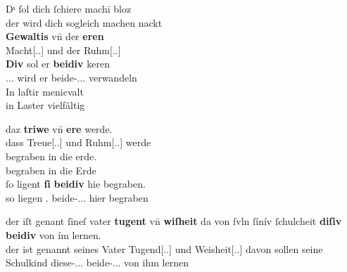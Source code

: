 \begin{exe}
\ex \label{ex:beid2p2combrem}
	\begin{xlist}
	\ex \label{ex:beid2p2combrem_1}
		\gll Dˢ ſol dich ſchiere machī bloz \\
			der wird dich sogleich machen nackt \\
	\sn \gll \textbf{Gewaltis} vn̄ der \textbf{eren} \\
			Macht[\Gen.\Sg.\FemI] und der Ruhm[\Gen.\Pl.\FemI] \\
	\sn \gll \textbf{Div} sol er \textbf{beidiv} keren \\
			\Dem.\Acc.\Pl.\NeutI{} wird er beide-\Acc.\Pl.\NeutI.\St{}
			verwandeln \\
	\sn \gll In laſtir menicvalt \\
			in Laster vielfältig \\
		\begin{taggedline}{\parencite[\nopp M317, V.~13020--13023]{rem}}
		\trans {}
		\end{taggedline}

	\ex \label{ex:beid2p2combrem_2}
		\gll daz \textbf{triwe} vn̄ \textbf{ere} werde. \\
			dass Treue[\Nom.\Sg.\FemI] und Ruhm[\Nom.\Sg.\FemI] werde \\
	\sn \gll begraben in die erde. \\
			begraben in die Erde \\
	\sn \gll ſo ligent \textbf{ſi} \textbf{beidiv} hie begraben. \\
			so liegen \Tpl\subI.\Nom{} beide-\Nom.\Pl.\NeutI.\St{} hier
			begraben \\
		\begin{taggedline}{\parencite[\nopp M342, V.~18661--18663]{rem}}
		\trans {}
		\end{taggedline}

	\ex \label{ex:beid2p2combrem_3}
		\gll der iſt genant ſineſ vater \textbf{tugent} vn̄ \textbf{wiſheit}
			{da von} ſvln ſínív ſchulcheit\upshape\footnotemark{} \textbf{diſiv}
			\textbf{beidiv} von ím lernen. \\
			der ist genannt seines Vater Tugend[\Nom.\Sg.\FemI] und
			Weisheit[\Nom.\Sg.\FemI] davon sollen seine Schulkind
			diese-\Acc.\Pl.\NeutI.\St{} beide-\Acc.\Pl.\NeutI.\St{} von ihm
			lernen \\
		\begin{taggedline}{\parencite[\nopp M401, Bl.~108\vo, 19--21]{rem}}
		\trans {}
		\end{taggedline}
	\end{xlist}
\end{exe}
